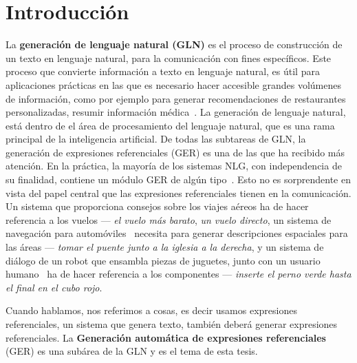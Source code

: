 \chapter{Introducci\'on}
\label{sec:intro}



La {\bf generaci\'on de lenguaje natural (GLN)} es el proceso de construcci\'on de un texto en lenguaje natural, para la comunicaci\'on con fines espec\'ificos. Este proceso que convierte informaci\'on a texto en lenguaje natural, es \'util para aplicaciones pr\'acticas en las que es necesario hacer accesible grandes vol\'umenes de informaci\'on, como por ejemplo para generar recomendaciones de restaurantes personalizadas, resumir informaci\'on m\'edica~\cite{dale2000}. La generaci\'on de lenguaje natural, est\'a dentro de el \'area de procesamiento del lenguaje natural, que es una rama principal de la inteligencia artificial. De todas las subtareas de GLN, la generaci\'on de expresiones referenciales (GER) es una de las que ha recibido m\'as atenci\'on. En la pr\'actica, la mayor\'ia de los
sistemas NLG, con independencia de su finalidad, contiene un m\'odulo GER de alg\'un tipo~\cite{Mellish2004}. Esto no es sorprendente
en vista del papel central que las expresiones referenciales tienen en la comunicaci\'on. Un sistema que proporciona
consejos sobre los viajes a\'ereos \cite{white2010generating} ha de hacer referencia a los vuelos --- {\it el
vuelo m\'as barato}, {\it un vuelo directo}, un sistema de navegaci\'on para autom\'oviles~\cite{Drager:2012:GLN:2380816.2380908}
necesita para generar descripciones espaciales para las \'areas --- {\it tomar el puente junto a la iglesia a la derecha},
y un sistema de di\'alogo de un robot que ensambla piezas de juguetes, junto con un usuario humano~\cite{foster-etal-ijcai2009} ha de hacer referencia a los componentes --- {\it inserte el perno verde hasta el final en el cubo rojo}.

Cuando hablamos, nos referimos a cosas, es decir usamos expresiones referenciales, un sistema que genera texto, tambi\'en deber\'a generar expresiones referenciales. La {\bf Generaci\'on autom\'atica de expresiones referenciales} (GER) es una sub\'area de la GLN y es el tema de esta tesis.


